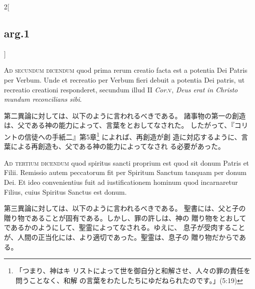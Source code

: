 \documentclass[paper=a4paper,fontsize=10pt,jafontsize=9pt,titlepage]{jlreq}
\begin{document}
\begin{paracol}{2}[\subsection{arg.1}]
\switchcolumn*[\subsection{ad.2}]

{\scshape Ad secundum dicendum} quod prima rerum creatio facta est a potentia Dei
Patris per Verbum. Unde et recreatio per Verbum fieri debuit a potentia
Dei patris, ut recreatio creationi responderet, secundum illud II
{\itshape Cor}.{\scshape v}, {\itshape Deus erat in Christo mundum reconcilians sibi}.

\switchcolumn

第二異論に対しては、以下のように言われるべきである。
諸事物の第一の創造は、父である神の能力によって、言葉をとおしてなされた。
 したがって、『コリントの信徒への手紙二』第5章\footnote{「つまり、神はキ
 リストによって世を御自分と和解させ、人々の罪の責任を問うことなく、和解
 の言葉をわたしたちにゆだねられたのです。」(5:19)} によれば、再創造が創
 造に対応するように、言葉による再創造も、父である神の能力によってなされ
 る必要があった。

\switchcolumn*[\subsection{ad.3}]

{\scshape Ad tertium dicendum} quod spiritus sancti proprium est quod sit donum
Patris et Filii. Remissio autem peccatorum fit per Spiritum Sanctum
tanquam per donum Dei. Et ideo convenientius fuit ad iustificationem
hominum quod incarnaretur Filius, cuius Spiritus Sanctus est donum.

\switchcolumn

第三異論に対しては、以下のように言われるべきである。
聖書には、父と子の贈り物であることが固有である。しかし、罪の許しは、神の
 贈り物をとおしてであるかのようにして、聖霊によってなされる。ゆえに、
息子が受肉することが、人間の正当化には、より適切であった。聖霊は、息子の
 贈り物だからである。

\end{paracol}
\newpage
\end{document}
